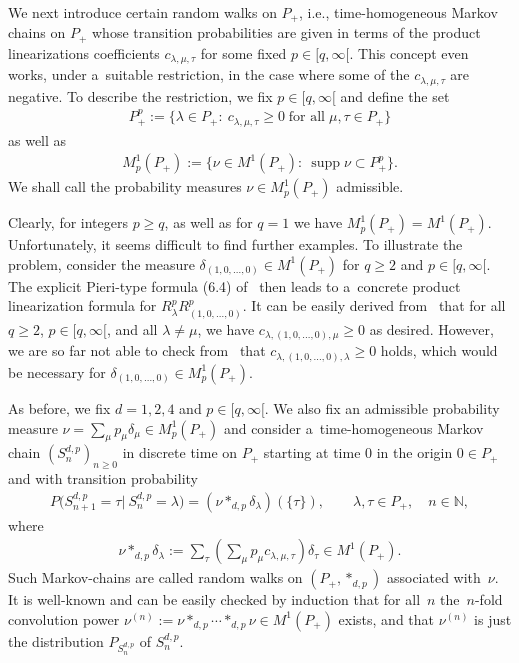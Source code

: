 \documentclass[11pt]{article}
\numberwithin{equation}{section}
\DeclareMathOperator{\supp}{supp}
\begin{document}
We next introduce certain random walks on $P_+$, i.e., time-homogeneous Markov chains on $P_+$ whose transition
probabilities are given in terms of the product linearizations coef\/f\/icients $c_{\lambda,\mu,\tau}$ for some f\/ixed
$p\in[q,\infty[$.
This concept even works, under a~suitable restriction, in the case where some of the $c_{\lambda,\mu,\tau}$ are negative.
To describe the restriction, we f\/ix $p\in[q,\infty[$ and def\/ine the set
\begin{gather*}
P_+^p:=\{\lambda\in P_+:\> c_{\lambda,\mu,\tau}\ge0
\;
\text{for all}
\;
\mu,\tau\in P_+\}
\end{gather*}
as well as
\begin{gather*}
M^1_p(P_+):=\big\{\nu\in M^1(P_+):\> \supp \nu\subset P_+^p\big\}.
\end{gather*}
We shall call the probability measures $\nu\in M^1_p(P_+)$ admissible.

Clearly, for integers $p\ge q$, as well as for $q=1$ we have $M^1_p(P_+)=M^1(P_+)$.
Unfortunately, it seems dif\/f\/icult to f\/ind further examples.
To illustrate the problem, consider the measure $\delta_{(1,0,\ldots,0)}\in M^1(P_+)$ for $q\ge 2$ and $p\in[q,\infty[$.
The explicit Pieri-type formula (6.4) of~\cite{D} then leads to a~concrete product linearization formula for
$R_\lambda^p  R_{(1,0,\ldots,0)}^p$.
It can be easily derived from~\cite{D} that for all $q\ge 2$, $p\in[q,\infty[$, and all $\lambda\ne \mu$, we have
$c_{\lambda,(1,0,\ldots,0), \mu}\ge0$ as desired.
However, we are so far not able to check from~\cite{D} that $c_{\lambda,(1,0,\ldots,0), \lambda}\ge0$ holds, which would
be necessary for $\delta_{(1,0,\ldots,0)}\in M^1_p(P_+)$.

As before, we f\/ix $d=1,2,4$ and $p\in [q,\infty[$.
We also f\/ix an admissible probability measure $\nu=\sum\limits_\mu p_\mu\delta_\mu\in M^1_p(P_+)$ and consider
a~time-homogeneous Markov chain $(S_n^{d,p})_{n\ge0}$ in discrete time on $P_+$ starting at time $0$ in the origin $0\in
P_+$ and with transition probability
\begin{gather*}
P\big(S_{n+1}^{d,p}=\tau|\> S_n^{d,p}
=\lambda\big)=(\nu*_{d,p}\delta_\lambda)(\{\tau\}),
\qquad
\lambda,\tau\in P_+,
\quad
n\in\mathbb N,
\end{gather*}
where
\begin{gather*}
\nu*_{d,p}\delta_\lambda:= \sum\limits_\tau \left(\sum\limits_\mu p_\mu c_{\lambda,\mu,\tau}\right) \delta_\tau\in M^1(P_+).
\end{gather*}
Such Markov-chains are called random walks on $(P_+,*_{d,p})$ associated with~$\nu$.
It is well-known and can be easily checked by induction that for all~$n$ the~$n$-fold convolution power
$\nu^{(n)}:=\nu*_{d,p}\cdots *_{d,p}\nu\in M^1(P_+)$ exists, and that $\nu^{(n)}$ is just the distribution
$P_{S_n^{d,p}}$ of $S_n^{d,p}$.
\end{document}

